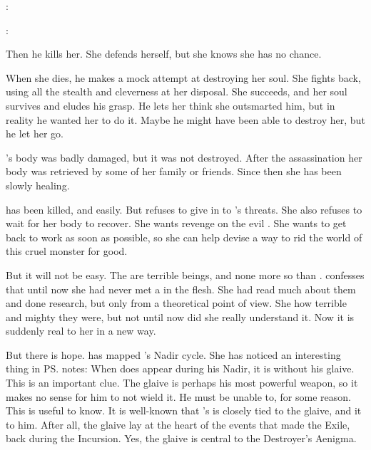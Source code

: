 \begin{prose}
  \Urizeth: 

  \Ishnaruchaefir: 
\end{prose}

Then he kills her. 
She defends herself, but she knows she has no chance. 

When she dies, he makes a mock attempt at destroying her soul. 
She fights back, using all the \TiphredSerah{} stealth and cleverness at her disposal. 
She succeeds, and her soul survives and eludes his grasp.
He lets her think she outsmarted him, but in reality he wanted her to do it. 
Maybe he might have been able to destroy her, but he let her go. 

\Urizeth's body was badly damaged, but it was not destroyed. 
After the assassination her body was retrieved by some of her family or friends.
Since then she has been slowly healing. 

\Urizeth has been killed, and easily.
But \Urizeth{} refuses to give in to \Ishnaruchaefir's threats. 
She also refuses to wait for her body to recover. 
She wants revenge on the evil \dragon. 
She wants to get back to work as soon as possible, so she can help \Teshrial{} devise a way to rid the world of this cruel monster for good. 



\begin{comment}
  \section{Urizeth has mapped the Nadir}
\end{comment}

But it will not be easy. 
The \dragons are terrible beings, and none more so than \Ishnaruchaefir.
\Urizeth confesses that until now she had never met a \dragon in the flesh.
She had read much about them and done research, but only from a theoretical point of view. 
She  how terrible and mighty they were, but not until now did she really understand it.
Now it is suddenly real to her in a new way. 

But there is hope.
\Urizeth has mapped \Ishnaruchaefir's Nadir cycle. 
She has noticed an interesting thing in \ps{\Lothagiel} notes: 
When \Ishnaruchaefir does appear during his Nadir, it is without his glaive. 
This is an important clue. 
The glaive is perhaps his most powerful weapon, so it makes no sense for him to not wield it. 
He must be unable to, for some reason. 
This is useful to know. 
It is well-known that \Ishnaruchaefir's \vertex is closely tied to the glaive, and it to him. 
After all, the glaive lay at the heart of the events that made \Ishnaruchaefir the Exile, back during the Incursion. 
Yes, the glaive is central to the Destroyer's Aenigma. 

